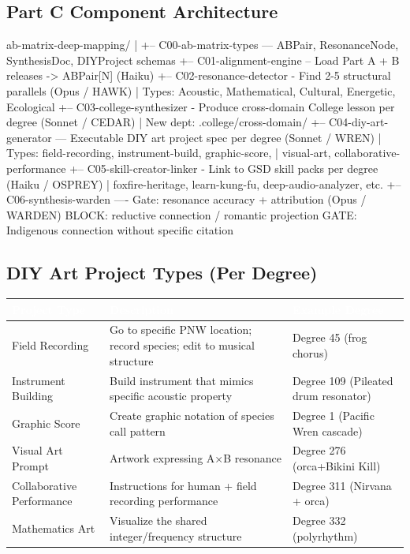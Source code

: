 \documentclass[11pt,letterpaper]{article}
\newcommand{\tblhdr}[1]{\textbf{\sffamily\textcolor{white}{#1}}}
\begin{document}
\subsection{Part C Component Architecture}

\begin{asciibox}
ab-matrix-deep-mapping/
|
+-- C00-ab-matrix-types --- ABPair, ResonanceNode, SynthesisDoc, DIYProject schemas
+-- C01-alignment-engine -- Load Part A + B releases -> ABPair[N] (Haiku)
+-- C02-resonance-detector - Find 2-5 structural parallels (Opus / HAWK)
|                            Types: Acoustic, Mathematical, Cultural, Energetic, Ecological
+-- C03-college-synthesizer - Produce cross-domain College lesson per degree (Sonnet / CEDAR)
|                             New dept: .college/cross-domain/
+-- C04-diy-art-generator --- Executable DIY art project spec per degree (Sonnet / WREN)
|                             Types: field-recording, instrument-build, graphic-score,
|                                    visual-art, collaborative-performance
+-- C05-skill-creator-linker - Link to GSD skill packs per degree (Haiku / OSPREY)
|                              foxfire-heritage, learn-kung-fu, deep-audio-analyzer, etc.
+-- C06-synthesis-warden ---- Gate: resonance accuracy + attribution (Opus / WARDEN)
                              BLOCK: reductive connection / romantic projection
                              GATE: Indigenous connection without specific citation
\end{asciibox}

\subsection{DIY Art Project Types (Per Degree)}

\begin{center}
\begin{tabularx}{\textwidth}{L{3.5cm}XL{2.5cm}}
\toprule
{}
\tblhdr{Project Type} & \tblhdr{Description} & \tblhdr{Example Degree} \\
\midrule
Field Recording & Go to specific PNW location; record species; edit to musical structure & Degree 45 (frog chorus) \\
Instrument Building & Build instrument that mimics specific acoustic property & Degree 109 (Pileated drum resonator) \\
Graphic Score & Create graphic notation of species call pattern & Degree 1 (Pacific Wren cascade) \\
Visual Art Prompt & Artwork expressing A×B resonance & Degree 276 (orca+Bikini Kill) \\
Collaborative Performance & Instructions for human + field recording performance & Degree 311 (Nirvana + orca) \\
Mathematics Art & Visualize the shared integer/frequency structure & Degree 332 (polyrhythm) \\
\bottomrule
\end{tabularx}
\end{center}
\end{document}
